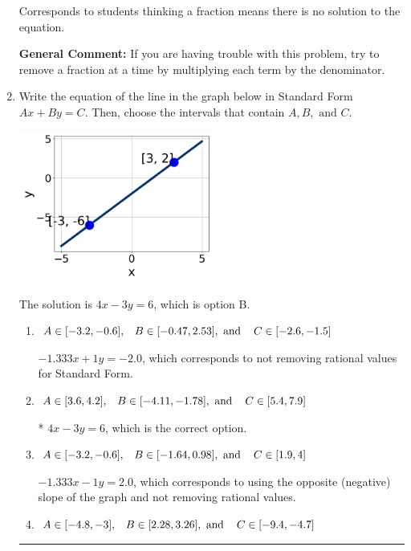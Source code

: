 \documentclass{extbook}[14pt]
\newcommand{\litem}[1]{\item #1

\rule{\textwidth}{0.4pt}}
\begin{document}
\begin{enumerate}
{\begin{enumerate}[label=\Alph*.]
Corresponds to students thinking a fraction means there is no solution to the equation.
\end{enumerate}

\textbf{General Comment:} If you are having trouble with this problem, try to remove a fraction at a time by multiplying each term by the denominator.
}
\litem{
Write the equation of the line in the graph below in Standard Form $Ax+By=C$. Then, choose the intervals that contain $A, B, \text{ and } C$.

\begin{center}
    \includegraphics[width=0.5\textwidth]{../Figures/linearGraphToStandardCopyB.png}
\end{center}


The solution is \( 4x - 3y = 6 \), which is option B.\begin{enumerate}[label=\Alph*.]
\item \( A \in [-3.2, -0.6], \hspace{3mm} B \in [-0.47, 2.53], \text{ and } \hspace{3mm} C \in [-2.6, -1.5] \)

 $-1.333x + 1y = -2.0$, which corresponds to not removing rational values for Standard Form.
\item \( A \in [3.6, 4.2], \hspace{3mm} B \in [-4.11, -1.78], \text{ and } \hspace{3mm} C \in [5.4, 7.9] \)

* $4x - 3y = 6$, which is the correct option.
\item \( A \in [-3.2, -0.6], \hspace{3mm} B \in [-1.64, 0.98], \text{ and } \hspace{3mm} C \in [1.9, 4] \)

 $-1.333x - 1y = 2.0$, which corresponds to using the opposite (negative) slope of the graph and not removing rational values.
\item \( A \in [-4.8, -3], \hspace{3mm} B \in [2.28, 3.26], \text{ and } \hspace{3mm} C \in [-9.4, -4.7] \)


\end{enumerate}}
\end{enumerate}
\end{document}
